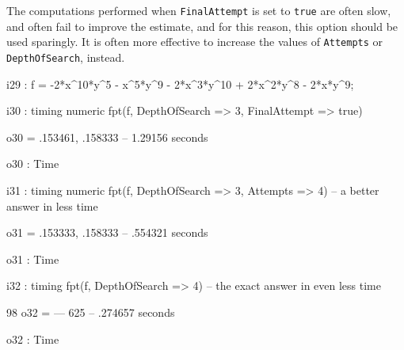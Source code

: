 \documentclass{amsart}
\begin{document}
The computations performed when {\tt FinalAttempt} is set to {\tt true} are often slow, and often fail to improve the estimate, and for this reason, this option should be used sparingly. It is often more effective to increase the values of {\tt Attempts} or {\tt DepthOfSearch}, instead.            
            
{\small
{}
\begin{MyVerbatim}

i29 : f = -2*x^10*y^5 - x^5*y^9 - 2*x^3*y^10 + 2*x^2*y^8 - 2*x*y^9;

i30 : timing numeric fpt(f, DepthOfSearch => 3, FinalAttempt => true)

o30 = {.153461, .158333}
      -- 1.29156 seconds

o30 : Time

i31 : timing numeric fpt(f, DepthOfSearch => 3, Attempts => 4) -- a better 
      answer in less time

o31 = {.153333, .158333}
      -- .554321 seconds

o31 : Time

i32 : timing fpt(f, DepthOfSearch => 4) -- the exact answer in even less 
      time

       98
o32 = ---
      625
      -- .274657 seconds

o32 : Time
\end{MyVerbatim}
}
\medspace

\end{document}
